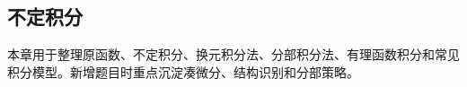 \subsection{不定积分}

\begin{knowledgeBox}
本章用于整理原函数、不定积分、换元积分法、分部积分法、有理函数积分和常见积分模型。新增题目时重点沉淀凑微分、结构识别和分部策略。
\end{knowledgeBox}
